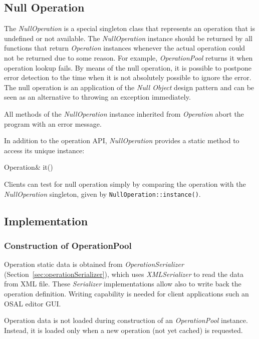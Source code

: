 \documentclass[a4paper,twoside]{tce}
\begin{document}
\subsection{Null Operation}
\label{ssec:nullOperation}

The \emph{NullOperation} is a special singleton class that represents an
operation that is undefined or not available.  The \emph{NullOperation}
instance should be returned by all functions that return \emph{Operation}
instances whenever the actual operation could not be returned due to some
reason.  For example, \emph{OperationPool} returns it when operation lookup
fails.  By means of the null operation, it is possible to postpone error
detection to the time when it is not absolutely possible to ignore the
error.  The null operation is an application of the \emph{Null Object}
design pattern and can be seen as an alternative to throwing an exception
immediately.

All methods of the \emph{NullOperation} instance inherited from
\emph{Operation} abort the program with an error message.

In addition to the operation API, \emph{NullOperation} provides a static
method to access its unique instance:
\begin{description}
\item[Operation\& it()]
\end{description}

Clients can test for null operation simply by comparing the operation with
the \emph{NullOperation} singleton, given by \verb|NullOperation::instance()|.

\subsection{Implementation}

\subsubsection{Construction of OperationPool}

Operation static data is obtained from \emph{OperationSerializer}
(Section~\ref{sec:operationSerializer}), which uses \emph{XMLSerializer}
\cite{ToolkitDesign} to read the data from XML file.  These
\emph{Serializer} implementations allow also to write back the operation
definition.  Writing capability is needed for client applications such an
OSAL editor GUI.

Operation data is not loaded during construction of an \emph{OperationPool}
instance.  Instead, it is loaded only when a new operation (not yet cached)
is requested.
\end{document}
